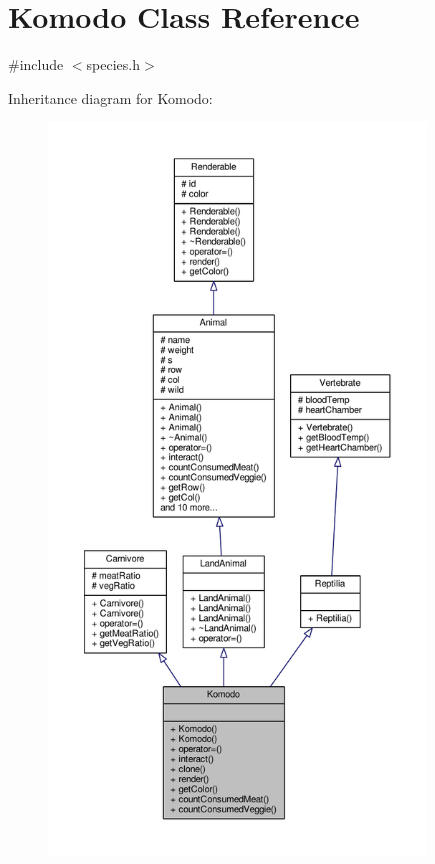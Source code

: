 \hypertarget{classKomodo}{}\section{Komodo Class Reference}
\label{classKomodo}


{\ttfamily \#include $<$species.\+h$>$}



Inheritance diagram for Komodo\+:
\nopagebreak
\begin{figure}[H]
\begin{center}
\leavevmode
\includegraphics[height=550pt]{classKomodo__inherit__graph}
\end{center}
\end{figure}


